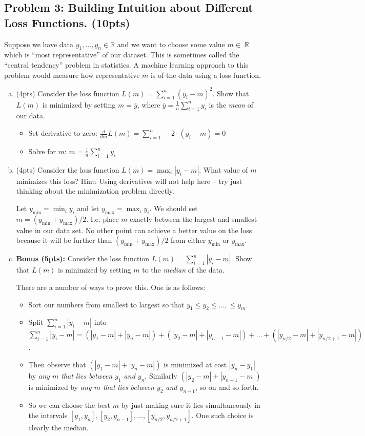 \documentclass[10pt]{article}
\DeclareMathOperator{\R}{\mathbb{R}}
\begin{document}
\subsection{Problem 3: Building Intuition about Different Loss Functions. (10pts)}
Suppose we have data  $y_1, \ldots, y_n \in \mathbb{R}$ and we want to choose some value $m \in \R$ which is ``most representative'' of our dataset. This is sometimes called the ``central tendency'' problem in statistics. A machine learning approach to this problem would measure how representative $m$ is of the data using a loss function. 
\begin{enumerate}[(a)]
	\item (4pts) Consider the loss function $L(m) = \sum_{i=1}^n (y_i - m)^2$. Show that $L(m)$ is minimized by setting $m = \bar{y}$, where $\bar{y} = \frac{1}{n}\sum_{i=1}^n y_i$ is the \emph{mean} of our data. 
		\begin{itemize}
		\item Set derivative to zero: $\frac{d}{d m} L(m) = \sum_{i=1}^n -2\cdot(y_i - m) = 0$
		\item Solve for $m$: $m = \frac{1}{n}\sum_{i=1}^n y_i$
	\end{itemize}

	\item (4pts) Consider the loss function $L(m) = \max_i|y_i - m|$. What value of $m$ minimizes this loss? Hint: Using derivatives will not help here -- try just thinking about the minimization problem directly.
	
	Let $y_{\text{min}} = \min_i y_i$ and let  $y_{\text{max}} = \max_i y_i$. We should set $m = (y_{\text{min}} + y_{\text{max}})/2$. I.e. place $m$ exactly between the largest and smallest value in our data set. No other point can achieve a better value on the loss because it will be further than $(y_{\text{min}} + y_{\text{max}})/2$ from either $y_{\text{min}}$ or $y_{\text{max}}$.

	\item \textbf{Bonus (5pts):} Consider the loss function $L(m) = \sum_{i=1}^n |y_i - m|$. Show that $L(m)$ is minimized by setting $m$ to the \emph{median} of the data. 
	
	There are a number of ways to prove this. One is as follows:
	\begin{itemize}
		\item Sort our numbers from smallest to largest so that $y_1 \leq y_2 \leq \ldots, \leq y_m$.
		\item Split $\sum_{i=1}^n |y_i - m|$ into $\sum_{i=1}^n |y_i - m| = (|y_1 - m| + |y_n - m| ) + (|y_2 - m| + |y_{n-1} - m|) + \ldots + (|y_{n/2} - m| + |y_{n/2+1} - m|)$.
		\item Then observe that $(|y_1 - m| + |y_n - m| )$ is minimized at cost $|y_n - y_1|$ by \emph{any $m$ that lies between $y_1$ and $y_n$}. Similarly $(|y_2 - m| + |y_{n-1} - m| )$ is minimized by \emph{any $m$ that lies between $y_2$ and $y_{n-1}$}, so on and so forth. 
		\item So we can choose the best $m$ by just making sure it lies simultaneously in the intervals $[y_1,y_n], [y_2,y_{n-1}],\ldots, [y_{n/2},y_{n/2 + 1}]$. One such choice is clearly the median.
	\end{itemize}


\end{enumerate}
\end{document}

